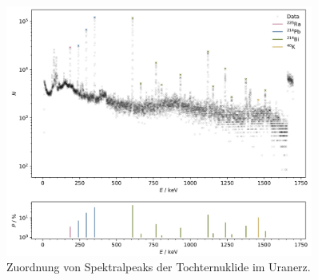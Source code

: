 \begin{figure}[H]
    \centering
    \includegraphics[width=0.9\textwidth]{content/plots/plot12.jpg}
    \caption{Zuordnung von Spektralpeaks der Tochternuklide im Uranerz.}
    \label{fig:plot12}
\end{figure}
